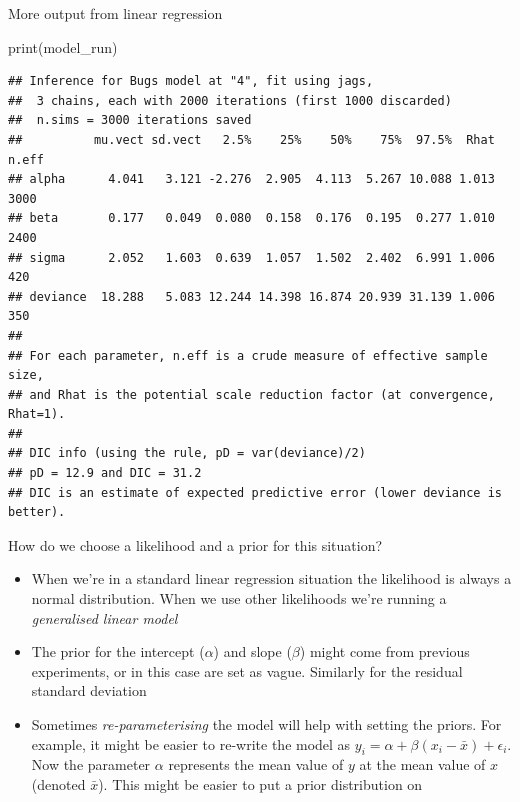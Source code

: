 \documentclass[
  ignorenonframetext,
  aspectratio=169]{beamer}
\newenvironment{Shaded}{\begin{snugshade}}{\end{snugshade}}
\newcommand{\FunctionTok}[1]{\textcolor[rgb]{0.00,0.00,0.00}{#1}}
\newcommand{\NormalTok}[1]{#1}
\providecommand{\tightlist}{%
  \setlength{\itemsep}{0pt}\setlength{\parskip}{0pt}}
\begin{document}
\begin{frame}[fragile]{More output from linear regression}
\protect\hypertarget{more-output-from-linear-regression}{}
\small

\begin{Shaded}
\begin{Highlighting}[]
\FunctionTok{print}\NormalTok{(model\_run)}
\end{Highlighting}
\end{Shaded}

\begin{verbatim}
## Inference for Bugs model at "4", fit using jags,
##  3 chains, each with 2000 iterations (first 1000 discarded)
##  n.sims = 3000 iterations saved
##          mu.vect sd.vect   2.5%    25%    50%    75%  97.5%  Rhat n.eff
## alpha      4.041   3.121 -2.276  2.905  4.113  5.267 10.088 1.013  3000
## beta       0.177   0.049  0.080  0.158  0.176  0.195  0.277 1.010  2400
## sigma      2.052   1.603  0.639  1.057  1.502  2.402  6.991 1.006   420
## deviance  18.288   5.083 12.244 14.398 16.874 20.939 31.139 1.006   350
## 
## For each parameter, n.eff is a crude measure of effective sample size,
## and Rhat is the potential scale reduction factor (at convergence, Rhat=1).
## 
## DIC info (using the rule, pD = var(deviance)/2)
## pD = 12.9 and DIC = 31.2
## DIC is an estimate of expected predictive error (lower deviance is better).
\end{verbatim}
\end{frame}

\begin{frame}{How do we choose a likelihood and a prior for this
situation?}
\protect\hypertarget{how-do-we-choose-a-likelihood-and-a-prior-for-this-situation}{}
\begin{itemize}
\tightlist
\item
  When we're in a standard linear regression situation the likelihood is
  always a normal distribution. When we use other likelihoods we're
  running a \emph{generalised linear model}
\item
  The prior for the intercept (\(\alpha\)) and slope (\(\beta\)) might
  come from previous experiments, or in this case are set as vague.
  Similarly for the residual standard deviation
\item
  Sometimes \emph{re-parameterising} the model will help with setting
  the priors. For example, it might be easier to re-write the model as
  \(y_i = \alpha + \beta (x_i - \bar{x}) + \epsilon_i\). Now the
  parameter \(\alpha\) represents the mean value of \(y\) at the mean
  value of \(x\) (denoted \(\bar{x}\)). This might be easier to put a
  prior distribution on
\end{itemize}
\end{frame}
\end{document}
